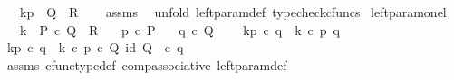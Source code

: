 \begin{isabellebody}
\ \ \ {\isachardoublequoteopen}k\isactrlbsub {\isacharbrackleft}{\kern0pt}p{\isacharcomma}{\kern0pt}{\isacharminus}{\kern0pt}{\isacharbrackright}{\kern0pt}\isactrlesub \ {\isacharcolon}{\kern0pt}\ Q\ {\isasymrightarrow}\ R{\isachardoublequoteclose}\isanewline
%
\isadelimproof
\ \ %
\endisadelimproof
%
\isatagproof
{}\isamarkupfalse%
\ assms\ \isamarkupfalse%
\ {\isacharparenleft}{\kern0pt}unfold\ left{\isacharunderscore}{\kern0pt}param{\isacharunderscore}{\kern0pt}def{}{\isacharcomma}{\kern0pt}\ typecheck{\isacharunderscore}{\kern0pt}cfuncs{\isacharparenright}{\kern0pt}%
\endisatagproof
{\isafoldproof}%
%
\isadelimproof
\isanewline
%
\endisadelimproof
\isanewline
{}\isamarkupfalse%
\ left{\isacharunderscore}{\kern0pt}param{\isacharunderscore}{\kern0pt}on{\isacharunderscore}{\kern0pt}el{\isacharcolon}{\kern0pt}\isanewline
\ \ \ {\isachardoublequoteopen}k\ {\isacharcolon}{\kern0pt}\ P\ {\isasymtimes}\isactrlsub c\ Q\ {\isasymrightarrow}\ R{\isachardoublequoteclose}\isanewline
\ \ \ {\isachardoublequoteopen}p\ {\isasymin}\isactrlsub c\ P{\isachardoublequoteclose}\isanewline
\ \ \ {\isachardoublequoteopen}q\ {\isasymin}\isactrlsub c\ Q{\isachardoublequoteclose}\isanewline
\ \ \ \ {\isachardoublequoteopen}k\isactrlbsub {\isacharbrackleft}{\kern0pt}p{\isacharcomma}{\kern0pt}{\isacharminus}{\kern0pt}{\isacharbrackright}{\kern0pt}\isactrlesub \ {\isasymcirc}\isactrlsub c\ q\ {\isacharequal}{\kern0pt}\ k\ {\isasymcirc}\isactrlsub c\ {\isasymlangle}p{\isacharcomma}{\kern0pt}\ q{\isasymrangle}{\isachardoublequoteclose}\isanewline
%
\isadelimproof
%
\endisadelimproof
%
\isatagproof
{}\isamarkupfalse%
\ {\isacharminus}{\kern0pt}\ \isanewline
\ \ \isamarkupfalse%
\ {\isachardoublequoteopen}k\isactrlbsub {\isacharbrackleft}{\kern0pt}p{\isacharcomma}{\kern0pt}{\isacharminus}{\kern0pt}{\isacharbrackright}{\kern0pt}\isactrlesub \ {\isasymcirc}\isactrlsub c\ q\ {\isacharequal}{\kern0pt}\ k\ {\isasymcirc}\isactrlsub c\ {\isasymlangle}p\ {\isasymcirc}\isactrlsub c\ {\isasymbeta}\isactrlbsub Q\isactrlesub {\isacharcomma}{\kern0pt}\ id\ Q{\isasymrangle}\ \ {\isasymcirc}\isactrlsub c\ q{\isachardoublequoteclose}\isanewline
\ \ \ \ \isamarkupfalse%
\ assms\ cfunc{\isacharunderscore}{\kern0pt}type{\isacharunderscore}{\kern0pt}def\ comp{\isacharunderscore}{\kern0pt}associative\ left{\isacharunderscore}{\kern0pt}param{\isacharunderscore}{\kern0pt}def{}\ \isamarkupfalse%

\end{isabellebody}
